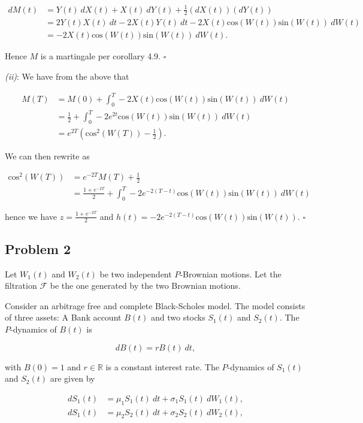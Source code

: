 \documentclass[
]{book}
\begin{document}
\begin{align*}
dM(t)&=Y(t)\ dX(t)+X(t)\ dY(t)+\frac{1}{2}(dX(t))(dY(t))\\
&=2Y(t)X(t)\ dt-2X(t)Y(t)\ dt-2X(t)\text{cos}(W(t))\text{sin}(W(t))\ dW(t)\\
&=-2X(t)\text{cos}(W(t))\text{sin}(W(t))\ dW(t).
\end{align*}

Hence \(M\) is a martingale per corollary 4.9. \(\square\)

\emph{(ii)}: We have from the above that

\begin{align*}
M(T)&=M(0)+\int_0^T-2X(t)\text{cos}(W(t))\text{sin}(W(t))\ dW(t)\\
&=\frac{1}{2}+\int_0^T-2e^{2t}\text{cos}(W(t))\text{sin}(W(t))\ dW(t)\\
&=e^{2T}\left(\text{cos}^2(W(T))-\frac{1}{2}\right).
\end{align*}

We can then rewrite as

\begin{align*}
\text{cos}^2(W(T))&=e^{-2T}M(T)+\frac{1}{2}\\
&=\frac{1+e^{-2T}}{2}+\int_0^T-2e^{-2(T-t)}\text{cos}(W(t))\text{sin}(W(t))\ dW(t)
\end{align*}

hence we have \(z=\frac{1+e^{-2T}}{2}\) and \(h(t)=-2e^{-2(T-t)}\text{cos}(W(t))\text{sin}(W(t))\). \(\square\)

\noindent\makebox[\linewidth]{\rule{\textwidth}{0.4pt}}

\hypertarget{problem-2-3}{%
\subsection{Problem 2}\label{problem-2-3}}

Let \(W_1(t)\) and \(W_2(t)\) be two independent \(P\)-Brownian motions. Let the filtration \(\mathcal{F}\) be the one generated by the two Brownian motions.

Consider an arbitrage free and complete Black-Scholes model. The model consists of three assets: A Bank account \(B(t)\) and two stocks \(S_1(t)\) and \(S_2(t)\). The \(P\)-dynamics of \(B(t)\) is

\[
dB(t)=rB(t)\ dt,
\]

with \(B(0)=1\) and \(r\in\mathbb{R}\) is a constant interest rate. The \(P\)-dynamics of \(S_1(t)\) and \(S_2(t)\) are given by

\begin{align*}
dS_1(t)&=\mu_1S_1(t)\ dt+\sigma_1 S_1(t)\ dW_1(t),\\
dS_1(t)&=\mu_2S_2(t)\ dt+\sigma_2 S_2(t)\ dW_2(t),
\end{align*}
\end{document}
